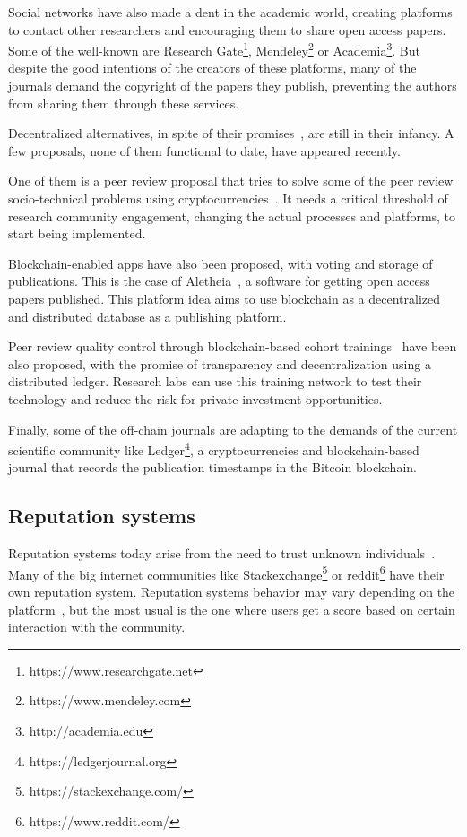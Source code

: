 Social networks have also made a dent in the academic world, creating platforms
to contact other researchers and encouraging them to share open access papers.
Some of the well-known are Research Gate\footnote{https://www.researchgate.net},
Mendeley\footnote{https://www.mendeley.com} or
Academia\footnote{http://academia.edu}. But despite the good intentions of the
creators of these platforms, many of the journals demand the copyright of the
papers they publish, preventing the authors from sharing them through these
services.


Decentralized alternatives, in spite of their
promises~\cite{bartlingblockchain}, are still in their infancy. A few proposals,
none of them functional to date, have appeared recently.

One of them is a peer review proposal that tries to solve some of the peer
review socio-technical problems using cryptocurrencies~\cite{tennant2017multi}.
It needs a critical threshold of research community engagement, changing the
actual processes and platforms, to start being implemented.

Blockchain-enabled apps have also been proposed, with voting and storage of
publications. This is the case of Aletheia~\cite{morton2017aletheia}, a software
for getting open access papers published. This platform idea aims to use
blockchain as a decentralized and distributed database as a publishing platform.

Peer review quality control through blockchain-based cohort
trainings~\cite{dhillon2016bench} have been also proposed, with the promise of
transparency and decentralization using a distributed ledger. Research labs can
use this training network to test their technology and reduce the risk for
private investment opportunities.

Finally, some of the off-chain journals are adapting to the demands of the
current scientific community like Ledger\footnote{https://ledgerjournal.org}, a
cryptocurrencies and blockchain-based journal that records the publication
timestamps in the Bitcoin blockchain.

\subsection{Reputation systems}
\label{soa:rs}
Reputation systems today arise from the need to trust unknown
individuals~\cite{resnick2000reputation}. Many of the big internet communities
like Stackexchange\footnote{https://stackexchange.com/} or
reddit\footnote{https://www.reddit.com/} have their own reputation system.
Reputation systems behavior may vary depending on the
platform~\cite{josang2002beta}, but the most usual is the one where users get a
score based on certain interaction with the community.

